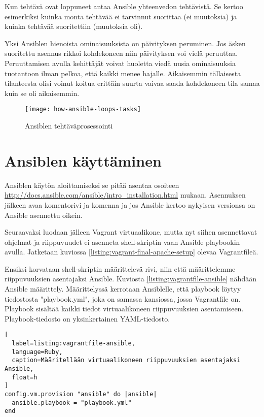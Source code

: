 Kun tehtävä ovat loppuneet antaa Ansible yhteenvedon tehtävistä. Se kertoo esimerkiksi kuinka monta tehtävää ei tarvinnut suorittaa (ei muutoksia) ja kuinka tehtävää suoritettiin (muutoksia oli).

Yksi Ansiblen hienoista ominaisuuksista on päivityksen peruminen. Jos äsken suoritettu asennus rikkoi kohdekoneen niin päivityksen voi vielä peruuttaa. Peruuttamisen avulla kehittäjät voivat huoletta viedä uusia ominaisuuksia tuotantoon ilman pelkoa, että kaikki menee hajalle. Aikaisemmin tällaisesta tilanteesta olisi voinut koitua erittäin suurta vaivaa saada kohdekoneen tila samaa kuin se oli aikaisemmin.

\begin{figure}[h]
  \centering
  \texttt{[image: how-ansible-loops-tasks]}
  \caption{Ansiblen tehtäväprosessointi}
  \label{fig:how-ansible-loops-tasks}
\end{figure}

\section{Ansiblen käyttäminen}

Ansiblen käytön aloittamiseksi se pitää asentaa osoiteen \url{http://docs.ansible.com/ansible/intro_installation.html} mukaan. Asennuksen jälkeen avaa komentorivi ja komenna  ja jos Ansible kertoo nykyisen versionsa on Ansible asennettu oikein.

Seuraavaksi luodaan jälleen Vagrant virtuaalikone, mutta nyt siihen asennettavat ohjelmat ja riippuvuudet ei asenneta shell-skriptin vaan Ansible playbookin avulla. Jatketaan kuviossa \ref{listing:vagrant-final-apache-setup} olevaa Vagrantfileä.

Ensiksi korvataan shell-skriptin määrittelevä rivi, niin että määrittelemme riippuvuuksien asentajaksi Ansible. Kuviosta \ref{listing:vagrantfile-ansible} nähdään Ansible määrittely. Määrittelyssä kerrotaan Ansiblelle, että playbook löytyy tiedostosta "playbook.yml", joka on samassa kansiossa, jossa Vagrantfile on. Playbook sisältää kaikki tiedot virtuaalikoneen riippuvuuksien asentamiseen. Playbook-tiedosto on yksinkertainen YAML-tiedosto.

\begin{lstlisting}[
  label=listing:vagrantfile-ansible,
  language=Ruby,
  caption=Määritellään virtuaalikoneen riippuvuuksien asentajaksi Ansible,
  float=h
]
config.vm.provision "ansible" do |ansible|
  ansible.playbook = "playbook.yml"
end
\end{lstlisting}

